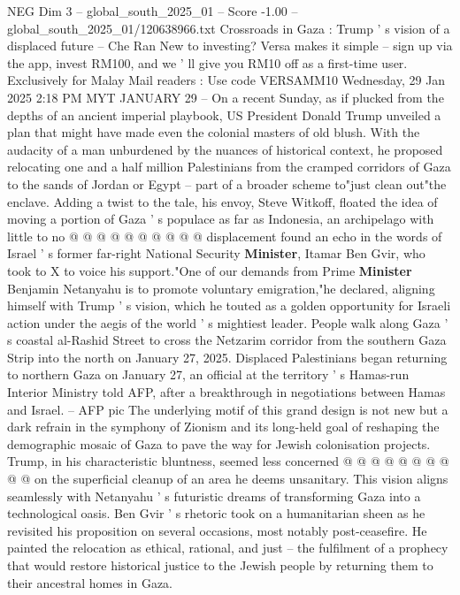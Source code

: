 \begin{textsample}{NEG Dim 3 – global\_south\_2025\_01 – Score -1.00 – global\_south\_2025\_01/120638966.txt}  \label{ex:f3_neg_055}
Crossroads in Gaza : Trump ' s vision of a displaced future -- Che Ran New to investing?
Versa makes it simple -- sign up via the app, invest RM100, and we ' ll give you RM10 off as a first-time user.
Exclusively for Malay Mail readers : Use code VERSAMM10 Wednesday, 29 Jan 2025 2:18 PM MYT JANUARY 29 -- On a recent Sunday, as if plucked from the depths of an ancient imperial playbook, US President Donald Trump unveiled a plan that might have made even the colonial masters of old blush.
With the audacity of a man unburdened by the nuances of historical context, he proposed relocating one and a half million Palestinians from the cramped corridors of Gaza to the sands of Jordan or Egypt -- part of a broader scheme to"just clean out"the enclave.
Adding a twist to the tale, his envoy, Steve Witkoff, floated the idea of moving a portion of Gaza ' s populace as far as Indonesia, an archipelago with little to no @ @ @ @ @ @ @ @ @ @ displacement found an echo in the words of Israel ' s former far-right National Security \textbf{Minister}, Itamar Ben Gvir, who took to X to voice his support."One of our demands from Prime \textbf{Minister} Benjamin Netanyahu is to promote voluntary emigration,"he declared, aligning himself with Trump ' s vision, which he touted as a golden opportunity for Israeli action under the aegis of the world ' s mightiest leader.
People walk along Gaza ' s coastal al-Rashid Street to cross the Netzarim corridor from the southern Gaza Strip into the north on January 27, 2025.
Displaced Palestinians began returning to northern Gaza on January 27, an official at the territory ' s Hamas-run Interior Ministry told AFP, after a breakthrough in negotiations between Hamas and Israel. -- AFP pic The underlying motif of this grand design is not new but a dark refrain in the symphony of Zionism and its long-held goal of reshaping the demographic mosaic of Gaza to pave the way for Jewish colonisation projects.
Trump, in his characteristic bluntness, seemed less concerned @ @ @ @ @ @ @ @ @ @ on the superficial cleanup of an area he deems unsanitary.
This vision aligns seamlessly with Netanyahu ' s futuristic dreams of transforming Gaza into a technological oasis.
Ben Gvir ' s rhetoric took on a humanitarian sheen as he revisited his proposition on several occasions, most notably post-ceasefire.
He painted the relocation as ethical, rational, and just -- the fulfilment of a prophecy that would restore historical justice to the Jewish people by returning them to their ancestral homes in Gaza.

\end{textsample}
